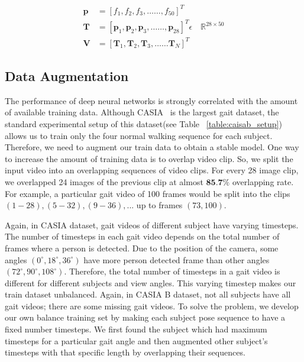 \begin{equation}
\label{equ:feature_preprocess}
\begin{split}
\boldsymbol{p} &= {[f_1, f_2, f_3, \ldots \ldots, f_{50}]}^T \\
\boldsymbol {T} &= {[\boldsymbol p_1, \boldsymbol p_2, \boldsymbol p_3,  \ldots \ldots, \boldsymbol p_{28}]}^T \epsilon \quad \mathbb {R}^{28\times 50}\\
\boldsymbol V &= {[\boldsymbol T_1, \boldsymbol T_2, \boldsymbol T_3,  \ldots \ldots \boldsymbol T_{N}]}^T 
\end{split}
\end{equation}


\subsection{Data Augmentation}
The performance of deep neural networks is strongly correlated with the amount of available training data.  Although CASIA~\cite{Yu_06} is the largest gait dataset, the standard experimental setup of this dataset(see Table ~\ref{table:caisab_setup}) allows us to train only the four normal walking sequence for each subject. Therefore, we need to augment our train data to obtain a stable model.  
One way to increase the amount of training data is to overlap video clip. So, we split the input video into an overlapping sequences of video clips. For every 28 image clip, we overlapped 24 images of the previous clip at almost $ \textbf{85.7\%} $ overlapping rate. For example, a particular gait video of 100 frames would be split into the clips $(1-28), (5-32), (9-36), ...$ up to frames $(73, 100)$. 

Again, in CASIA dataset, gait videos of different subject have varying timesteps. The number of timesteps in each gait video depends on the total number of frames where a person is detected. Due to the position of the camera, some angles ${(0^{\circ}, 18^{\circ}, 36^{\circ})}$ have more person detected frame than other angles ${(72^{\circ}, 90^{\circ}, 108^{\circ})}$. Therefore, the total number of timesteps in a gait video is different for different subjects and view angles. This varying timestep makes our train dataset unbalanced. Again, in CASIA B dataset, not all subjects have all gait videos; there are some missing gait videos. To solve the problem, we develop our own balance training set by making each subject pose sequence to have a fixed number timesteps. We first found the subject which had maximum timesteps for a particular gait angle and then augmented other subject's timesteps with that specific length by overlapping their sequences.

